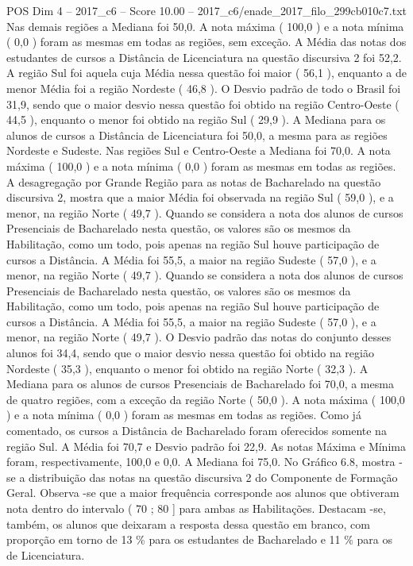 \begin{textsample}{POS Dim 4 – 2017\_c6 – Score 10.00 – 2017\_c6/enade\_2017\_filo\_299cb010c7.txt}
Nas demais regiões a Mediana foi 50,0.
A nota máxima ( 100,0 ) e a nota mínima ( 0,0 ) foram as mesmas em todas as regiões, sem exceção.
A Média das notas dos estudantes de cursos a Distância de Licenciatura na questão discursiva 2 foi 52,2.
A região Sul foi aquela cuja Média nessa questão foi maior ( 56,1 ), enquanto a de menor Média foi a região Nordeste ( 46,8 ).
O Desvio padrão de todo o Brasil foi 31,9, sendo que o maior desvio nessa questão foi obtido na região Centro-Oeste ( 44,5 ), enquanto o menor foi obtido na região Sul ( 29,9 ).
A Mediana para os alunos de cursos a Distância de Licenciatura foi 50,0, a mesma para as regiões Nordeste e Sudeste.
Nas regiões Sul e Centro-Oeste a Mediana foi 70,0.
A nota máxima ( 100,0 ) e a nota mínima ( 0,0 ) foram as mesmas em todas as regiões.
A desagregação por Grande Região para as notas de Bacharelado na questão discursiva 2, mostra que a maior Média foi observada na região Sul ( 59,0 ), e a menor, na região Norte ( 49,7 ).
Quando se considera a nota dos alunos de cursos Presenciais de Bacharelado nesta questão, os valores são os mesmos da Habilitação, como um todo, pois apenas na região Sul houve participação de cursos a Distância.
A Média foi 55,5, a maior na região Sudeste ( 57,0 ), e a menor, na região Norte ( 49,7 ).
Quando se considera a nota dos alunos de cursos Presenciais de Bacharelado nesta questão, os valores são os mesmos da Habilitação, como um todo, pois apenas na região Sul houve participação de cursos a Distância.
A Média foi 55,5, a maior na região Sudeste ( 57,0 ), e a menor, na região Norte ( 49,7 ).
O Desvio padrão das notas do conjunto desses alunos foi 34,4, sendo que o maior desvio nessa questão foi obtido na região Nordeste ( 35,3 ), enquanto o menor foi obtido na região Norte ( 32,3 ).
A Mediana para os alunos de cursos Presenciais de Bacharelado foi 70,0, a mesma de quatro regiões, com a exceção da região Norte ( 50,0 ).
A nota máxima ( 100,0 ) e a nota mínima ( 0,0 ) foram as mesmas em todas as regiões.
Como já comentado, os cursos a Distância de Bacharelado foram oferecidos somente na região Sul.
A Média foi 70,7 e Desvio padrão foi 22,9.
As notas Máxima e Mínima foram, respectivamente, 100,0 e 0,0.
A Mediana foi 75,0.
No Gráfico 6.8, mostra -se a distribuição das notas na questão discursiva 2 do Componente de Formação Geral.
Observa -se que a maior frequência corresponde aos alunos que obtiveram nota dentro do intervalo ( 70 ; 80 ] para ambas as Habilitações.
Destacam -se, também, os alunos que deixaram a resposta dessa questão em branco, com proporção em torno de 13 \% para os estudantes de Bacharelado e 11 \% para os de Licenciatura.

\end{textsample}
